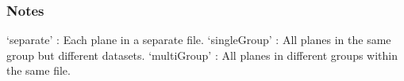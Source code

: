 \documentclass[letterpaper,10pt,english]{sphinxmanual}
\begin{document}
\begin{fulllineitems}
\begin{quote}
\begin{description}
\begin{description}
\begin{description}
\end{description}

\end{description}

\end{description}\end{quote}
\subsubsection*{Notes}
\begin{description}
\sphinxAtStartPar
‘separate’ : Each plane in a separate file.
‘singleGroup’ : All planes in the same group but different datasets.
‘multiGroup’ : All planes in different groups within the same file.

\end{description}

\end{fulllineitems}

\end{document}
